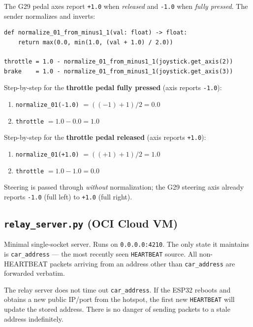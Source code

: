 \documentclass[12pt, letterpaper]{article}
\begin{document}
The G29 pedal axes report \texttt{+1.0} when \emph{released} and \texttt{-1.0}
when \emph{fully pressed}.  The sender normalizes and inverts:

\begin{lstlisting}[style=python]
def normalize_01_from_minus1_1(val: float) -> float:
    return max(0.0, min(1.0, (val + 1.0) / 2.0))

throttle = 1.0 - normalize_01_from_minus1_1(joystick.get_axis(2))
brake    = 1.0 - normalize_01_from_minus1_1(joystick.get_axis(3))
\end{lstlisting}

Step-by-step for the \textbf{throttle pedal fully pressed}
(axis reports \texttt{-1.0}):
\begin{enumerate}
  \item \texttt{normalize\_01(-1.0)} $= ((-1)+1)/2 = 0.0$
  \item \texttt{throttle} $= 1.0 - 0.0 = 1.0$
\end{enumerate}

Step-by-step for the \textbf{throttle pedal released}
(axis reports \texttt{+1.0}):
\begin{enumerate}
  \item \texttt{normalize\_01(+1.0)} $= ((+1)+1)/2 = 1.0$
  \item \texttt{throttle} $= 1.0 - 1.0 = 0.0$
\end{enumerate}

Steering is passed through \emph{without} normalization; the G29 steering axis
already reports \texttt{-1.0} (full left) to \texttt{+1.0} (full right).

\subsection{\texttt{relay\_server.py} (OCI Cloud VM)}

Minimal single-socket server.  Runs on \texttt{0.0.0.0:4210}.  The only state
it maintains is \texttt{car\_address} --- the most recently seen
\texttt{HEARTBEAT} source.  All non-HEARTBEAT packets arriving from an address
other than \texttt{car\_address} are forwarded verbatim.

\begin{designbox}
The relay server does not time out \texttt{car\_address}.  If the ESP32
reboots and obtains a new public IP/port from the hotspot, the first new
\texttt{HEARTBEAT} will update the stored address.  There is no danger of
sending packets to a stale address indefinitely.
\end{designbox}
\end{document}
